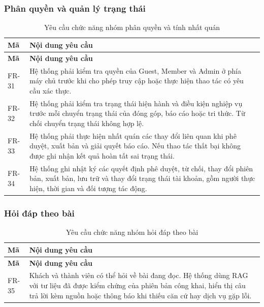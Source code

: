 \ReportNeedSpace{48mm}
\subsubsection{Phân quyền và quản lý trạng thái}

\begin{longtable}{|L{20mm}|L{124mm}|}
\caption{Yêu cầu chức năng nhóm phân quyền và tính nhất quán}\label{tab:chapter3-fr-31}\\\hline
{}\textbf{Mã} & \textbf{Nội dung yêu cầu}\\\hline
\endfirsthead
\hline
{}\textbf{Mã} & \textbf{Nội dung yêu cầu}\\\hline
\endhead
\endfoot
FR-31 & Hệ thống phải kiểm tra quyền của Guest, Member và Admin ở phía máy chủ trước khi cho phép truy cập hoặc thực hiện thao tác có yêu cầu xác thực.\\\hline
FR-32 & Hệ thống phải kiểm tra trạng thái hiện hành và điều kiện nghiệp vụ trước mỗi chuyển trạng thái của đóng góp, báo cáo hoặc tri thức. Từ chối chuyển trạng thái không hợp lệ.\\\hline
FR-33 & Hệ thống phải thực hiện nhất quán các thay đổi liên quan khi phê duyệt, xuất bản và giải quyết báo cáo. Nếu thao tác thất bại không được ghi nhận kết quả hoàn tất sai trạng thái.\\\hline
FR-34 & Hệ thống ghi nhật ký các quyết định phê duyệt, từ chối, thay đổi phiên bản, xuất bản, lưu trữ và thay đổi trạng thái tài khoản, gồm người thực hiện, thời gian và đối tượng tác động.\\\hline
\end{longtable}

\ReportNeedSpace{48mm}
\subsubsection{Hỏi đáp theo bài}

\begin{longtable}{|L{20mm}|L{124mm}|}
\caption{Yêu cầu chức năng nhóm hỏi đáp theo bài}\label{tab:chapter3-fr-35}\\\hline
{}\textbf{Mã} & \textbf{Nội dung yêu cầu}\\\hline
\endfirsthead
\hline
{}\textbf{Mã} & \textbf{Nội dung yêu cầu}\\\hline
\endhead
\endfoot
FR-35 & Khách và thành viên có thể hỏi về bài đang đọc. Hệ thống dùng RAG với tư liệu đã được kiểm chứng của phiên bản công khai, hiển thị câu trả lời kèm nguồn hoặc thông báo khi thiếu căn cứ hay dịch vụ gặp lỗi.\\\hline
\end{longtable}

